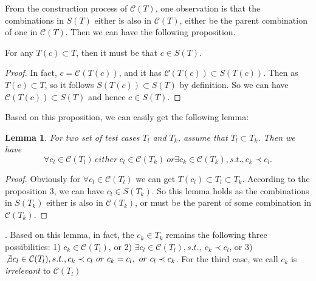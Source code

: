 \documentclass{sig-alternate}
\begin{document}
From the construction process of $\mathcal{C}(T)$, one observation is that the combinations in $S(T)$ either is also in $\mathcal{C}(T)$, either be the parent combination of one in $\mathcal{C}(T)$. Then we can have the following proposition.
\begin{proposition}
 For any $T(c) \subset T$, then it must be that $c \in S(T) $.
\end{proposition}
\begin{proof}
 In fact, $c = \mathcal{C}(T(c))$, and it has $ \mathcal{C}(T(c)) \subset S(T(c)) $. Then as $T(c) \subset T$, so it follows $S(T(c)) \subset S(T)$ by definition. So we can have $\mathcal{C}(T(c)) \subset S(T) $ and hence $c \in S(T)$.
\end{proof}




%

Based on this proposition, we can easily get the following lemma:
\newtheorem{lemma}{Lemma}
\begin{lemma}
For two set of test cases $T_{l}$ and $T_{k}$, assume that $T_{l} \subset T_{k}$. Then we have
 \begin{displaymath} \forall c_{l} \in \mathcal{C}(T_{l})\,  either\ c_{l} \in \mathcal{C}(T_{k})\ or \exists c_{k} \in \mathcal{C}(T_{k}), s.t., c_{k} \prec c_{l}.
 \end{displaymath}
\end{lemma}

\begin{proof}
Obviously for $\forall c_{l} \in \mathcal{C}(T_{l}) $ we can get $T(c_{l}) \subset T_{l} \subset T_{k}$. According to the proposition 3, we can have $c_{l} \in S(T_{k})$. So this lemma holds as the combinations in $S(T_{k})$ either is also in $\mathcal{C}(T_{k})$, or must be the parent of some combination in $\mathcal{C}(T_{k})$.
\end{proof}.
Based on this lemma, in fact, the $c_{k} \in T_{k}$  remains the following three possibilities: 1) $c_{k} \in \mathcal{C}(T_{l})$, or 2) $\exists c_{l} \in \mathcal{C}(T_{l}), s.t.,\ c_{k} \prec c_{l}$, or 3) $\not\exists c_{l} \in \mathcal{C}(T_{l}), s.t., c_{k} \prec c_{l}\ or\ c_{k} = c_{l},\ or\ c_{l} \prec c_{k}$. For the third case, we call $c_{k}$ is \emph{irrelevant} to $\mathcal{C}(T_{l})$
\end{document}
